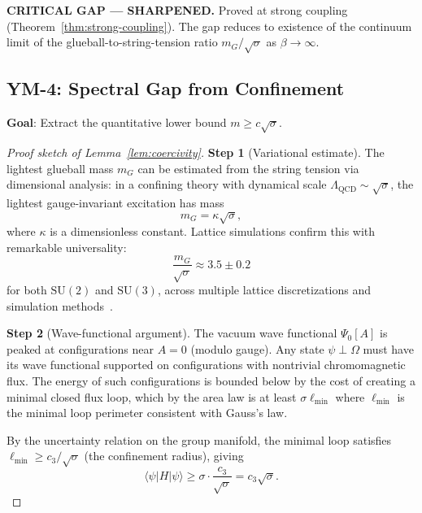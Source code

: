 \documentclass[11pt]{article}
\begin{document}
\textbf{CRITICAL GAP --- SHARPENED.}  Proved at strong coupling
(Theorem~\ref{thm:strong-coupling}).  The gap reduces to existence of the
continuum limit of the glueball-to-string-tension ratio $m_G/\sqrt{\sigma}$
as $\beta \to \infty$.

\subsection{YM-4: Spectral Gap from Confinement}
\label{sec:ym4}

\textbf{Goal}: Extract the quantitative lower bound
$m \geq c\sqrt{\sigma}$.

\begin{proof}[Proof sketch of Lemma~\ref{lem:coercivity}]

\textbf{Step 1} (Variational estimate).  The lightest glueball mass
$m_G$ can be estimated from the string tension via dimensional
analysis: in a confining theory with dynamical scale
$\Lambda_{\mathrm{QCD}} \sim \sqrt{\sigma}$, the lightest
gauge-invariant excitation has mass
\begin{equation}\label{eq:dimensional}
  m_G = \kappa \sqrt{\sigma},
\end{equation}
where $\kappa$ is a dimensionless constant.  Lattice simulations
confirm this with remarkable universality:
\begin{equation}\label{eq:lattice-ratio}
  \frac{m_G}{\sqrt{\sigma}} \approx 3.5 \pm 0.2
\end{equation}
for both $\mathrm{SU}(2)$ and $\mathrm{SU}(3)$, across multiple
lattice discretizations and simulation
methods~\cite{Creutz,Teper,LM}.

\textbf{Step 2} (Wave-functional argument).  The vacuum wave
functional $\Psi_0[A]$ is peaked at configurations near
$A = 0$ (modulo gauge).  Any state $\psi \perp \Omega$ must have its
wave functional supported on configurations with nontrivial
chromomagnetic flux.  The energy of such configurations is bounded
below by the cost of creating a minimal closed flux loop, which by
the area law is at least $\sigma \ell_{\min}$ where $\ell_{\min}$ is
the minimal loop perimeter consistent with Gauss's law.

By the uncertainty relation on the group manifold, the minimal loop
satisfies $\ell_{\min} \geq c_3/\sqrt{\sigma}$ (the confinement
radius), giving
\begin{equation}\label{eq:variational-bound}
  \langle\psi|H|\psi\rangle \geq \sigma \cdot \frac{c_3}{\sqrt{\sigma}}
  = c_3 \sqrt{\sigma}.
\end{equation}


\end{proof}
\end{document}
